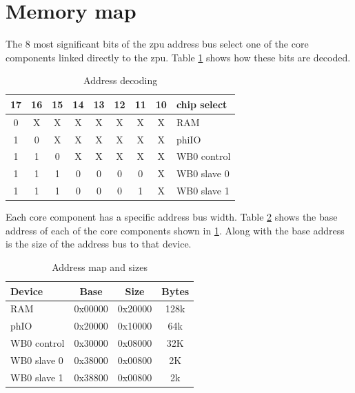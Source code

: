 \documentclass[a4paper,twocolumn,12pt]{article}
\begin{document}
\section{Memory map}

The 8 most significant bits of the zpu address bus select one of the core components linked directly to the zpu. Table \ref{tab:address_bits} shows how these bits are decoded.

\begin{table}[h]
\caption{Address decoding}
\label{tab:address_bits}
\begin{tabular}{| c | c | c | c | c | c | c | c | l |
}
    \hline
    17 & 16 & 15 & 14 & 13 & 12 & 11 & 10 & chip select \\ \hline
    0  & X  & X  & X  & X  & X  & X  & X  & RAM \\ \hline
    1  & 0  & X  & X  & X  & X  & X  & X  & phiIO \\ \hline
    1  & 1  & 0  & X  & X  & X  & X  & X  & WB0 control \\ \hline
    1  & 1  & 1  & 0  & 0  & 0  & 0  & X  & WB0 slave 0 \\ \hline
    1  & 1  & 1  & 0  & 0  & 0  & 1  & X  & WB0 slave 1 \\ \hline
\end{tabular}
\end{table}

Each core component has a specific address bus width. Table \ref{tab:address_map_hex} shows the base address of each of the core components shown in \ref{tab:address_bits}. Along with the base address is the size of the address bus to that device.

\begin{table}[h]
\caption{Address map and sizes}
\label{tab:address_map_hex}
\begin{tabular}{| l | c | c | c |
}
    \hline
    Device      & Base    & Size    & Bytes \\ \hline
    RAM         & 0x00000 & 0x20000 & 128k  \\ \hline
    phIO        & 0x20000 & 0x10000 & 64k   \\ \hline
    WB0 control & 0x30000 & 0x08000 & 32K   \\ \hline
    WB0 slave 0 & 0x38000 & 0x00800 & 2K    \\ \hline
    WB0 slave 1 & 0x38800 & 0x00800 & 2k    \\ \hline
\end{tabular}
\end{table}
\end{document}
